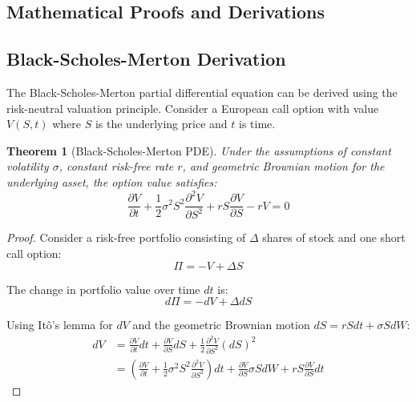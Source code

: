 \documentclass[12pt,a4paper]{article}
\newtheorem{theorem}{Theorem}[section]
\theoremstyle{definition}
\theoremstyle{remark}
\begin{document}
\begin{appendices}

\section{Mathematical Proofs and Derivations}
\label{appendix:proofs}

\subsection{Black-Scholes-Merton Derivation}

The Black-Scholes-Merton partial differential equation can be derived using the risk-neutral valuation principle. Consider a European call option with value $V(S,t)$ where $S$ is the underlying price and $t$ is time.

\begin{theorem}[Black-Scholes-Merton PDE]
\label{thm:bsm_pde}
Under the assumptions of constant volatility $\sigma$, constant risk-free rate $r$, and geometric Brownian motion for the underlying asset, the option value satisfies:
\begin{equation}
\frac{\partial V}{\partial t} + \frac{1}{2}\sigma^2 S^2 \frac{\partial^2 V}{\partial S^2} + rS\frac{\partial V}{\partial S} - rV = 0
\end{equation}
\end{theorem}

\begin{proof}
Consider a risk-free portfolio consisting of $\Delta$ shares of stock and one short call option:
\begin{equation}
\Pi = -V + \Delta S
\end{equation}

The change in portfolio value over time $dt$ is:
\begin{equation}
d\Pi = -dV + \Delta dS
\end{equation}

Using It\^{o}'s lemma for $dV$ and the geometric Brownian motion $dS = rS dt + \sigma S dW$:
\begin{align}
dV &= \frac{\partial V}{\partial t}dt + \frac{\partial V}{\partial S}dS + \frac{1}{2}\frac{\partial^2 V}{\partial S^2}(dS)^2\\
&= \left(\frac{\partial V}{\partial t} + \frac{1}{2}\sigma^2 S^2 \frac{\partial^2 V}{\partial S^2}\right)dt + \frac{\partial V}{\partial S}\sigma S dW + r S \frac{\partial V}{\partial S} dt
\end{align}


\end{proof}
\end{appendices}
\end{document}
